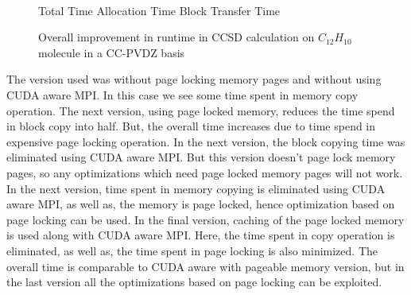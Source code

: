 \begin{figure}[h]
  
  \\
   Total Time
   Allocation Time
    Block Transfer Time
  \caption{Overall improvement in runtime in CCSD calculation on $C_{12}H_{10}$ molecule in a CC-PVDZ basis}
  \label{fig:gpu_real}
\end{figure}

The version used was without page locking memory pages and without using CUDA aware
MPI. In this case we see some time spent in memory copy operation. The next version,
using page locked memory, reduces the time spend in block copy into half. But, the
overall time increases due to time spend in expensive page locking operation. In
the next version, the block copying time was eliminated using CUDA aware MPI. But
this version doesn't page lock memory pages, so any optimizations which need page
locked memory pages will not work. In the next version, time spent in memory
copying is eliminated using CUDA aware MPI, as well as, the memory is page locked,
hence optimization based on page locking can be used. In the final version, caching
of the page locked memory is used along with CUDA aware MPI. Here, the time spent
in copy operation is eliminated, as well as, the time spent in page locking is
also minimized. The overall time is comparable to CUDA aware with pageable memory
version, but in the last version all the optimizations based on page locking can
be exploited.